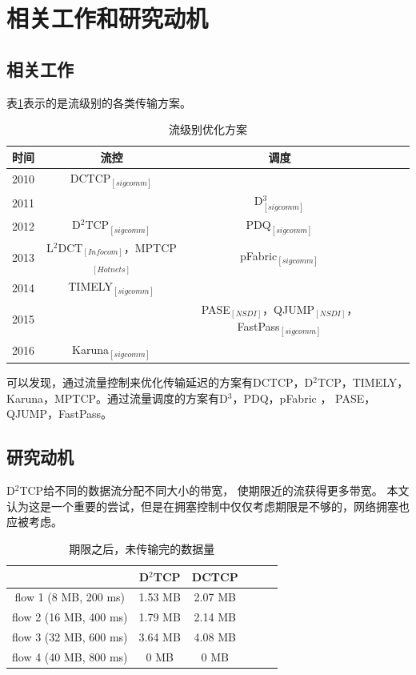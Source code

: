  \section{相关工作和研究动机}
 \label{sec_LPD:Background}
 \subsection{相关工作}
 表\ref{LPD-related}表示的是流级别的各类传输方案。
  \begin{table}[h]
\centering
\caption{流级别优化方案}\label{LPD-related}
\renewcommand{\arraystretch}{1.5}
\begin{tabular}{|c|c|c|c|c|c|} \hline
\setlength{\tabcolsep}{10pt}
 时间& 流控 &  调度 \\ \hline
2010 &DCTCP$_{\left[sigcomm\right]}$ & \\ \hline
2011 &&D$^3_{\left[sigcomm\right]}$ \\ \hline
2012 &D$^2$TCP$_{\left[sigcomm\right]}$&PDQ$_{\left[sigcomm\right]}$ \\ \hline
2013 & L$^2$DCT$_{\left[Infocom\right]}$，MPTCP$_{\left[Hotnets\right]}$&pFabric$_{\left[sigcomm\right]}$ \\ \hline
2014 &TIMELY$_{\left[sigcomm\right]}$& \\ \hline
2015 &    & PASE$_{\left[NSDI\right]}$，QJUMP$_{\left[NSDI\right]}$，FastPass$_{\left[sigcomm\right]}$\\ \hline
2016 &Karuna$_{\left[sigcomm\right]}$& \\ \hline
\end{tabular}
\end{table}
可以发现，通过流量控制来优化传输延迟的方案有DCTCP\cite{DCTCP}，D$^2$TCP\cite{D2TCP}，TIMELY\cite{mittal2015timely}，Karuna\cite{chen2016scheduling}，MPTCP\cite{wischik2011design}。通过流量调度的方案有D$^3$\cite{D3}，PDQ\cite{PDQ}，pFabric \cite{pFabric}，
PASE\cite{PASE}，QJUMP\cite{grosvenor2015queues}，FastPass\cite{perry2015fastpass}。

 \subsection{研究动机}
  \label{sec_LPD:Motivation}
 
 D$^2$TCP给不同的数据流分配不同大小的带宽，
 使期限近的流获得更多带宽。
本文认为这是一个重要的尝试，但是在拥塞控制中仅仅考虑期限是不够的，网络拥塞也应被考虑。
 
 
 \begin{table}[h]
\centering
\caption{期限之后，未传输完的数据量}\label{flowtable}
\renewcommand{\arraystretch}{1.5}
\begin{tabular}{|c|c|c|c|c|c|} \hline
\setlength{\tabcolsep}{10pt}
 & D$^2$TCP &  DCTCP \\ \hline
flow 1  (8 MB, 200 ms)   &1.53 MB &2.07 MB \\ \hline
flow 2  (16 MB, 400 ms)   &1.79 MB &2.14 MB \\ \hline
flow 3  (32 MB, 600 ms)   &3.64 MB &4.08 MB \\ \hline
flow 4  (40 MB, 800 ms)   &0 MB    &0 MB \\ \hline
\end{tabular}
\end{table}


